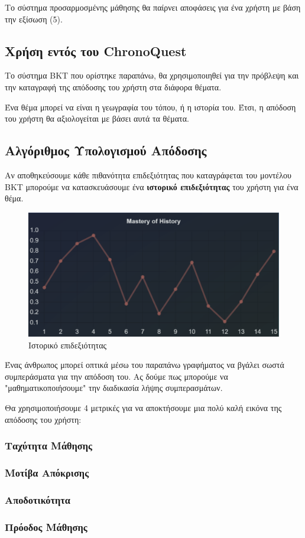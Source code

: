Το σύστημα προσαρμοσμένης μάθησης θα παίρνει αποφάσεις για ένα χρήστη με βάση την εξίσωση (5).

\subsection{Χρήση εντός του \textlatin{ChronoQuest}}

Το σύστημα \textlatin{BKT} που ορίστηκε παραπάνω, θα χρησιμοποιηθεί για την πρόβλεψη και την καταγραφή της απόδοσης του χρήστη στα διάφορα θέματα.

Ένα θέμα μπορεί να είναι η γεωγραφία του τόπου, ή η ιστορία του. Έτσι, η απόδοση του χρήστη θα αξιολογείται με βάσει αυτά τα θέματα. 

\subsection{Αλγόριθμος Υπολογισμού Απόδοσης}
Αν αποθηκεύσουμε κάθε πιθανότητα επιδεξιότητας που καταγράφεται του μοντέλου \textlatin{BKT} μπορούμε να κατασκευάσουμε ένα \textbf{ιστορικό επιδεξιότητας} του χρήστη για ένα θέμα.

\begin{figure}[H]
    \centering
    \includegraphics[width=0.5\linewidth]{img/MasteryGraph.png}
    \caption{Ιστορικό επιδεξιότητας}
\end{figure}

Ένας άνθρωπος μπορεί οπτικά μέσω του παραπάνω γραφήματος να βγάλει σωστά συμπεράσματα για την απόδοση του. Ας δούμε πως μπορούμε να "μαθηματικοποιήσουμε" την διαδικασία λήψης συμπερασμάτων.

Θα χρησιμοποιήσουμε 4 μετρικές για να αποκτήσουμε μια πολύ καλή εικόνα της απόδοσης του χρήστη:
\subsubsection{Ταχύτητα Μάθησης}
\subsubsection{Μοτίβα Απόκρισης}
\subsubsection{Αποδοτικότητα}
\subsubsection{Πρόοδος Μάθησης}
